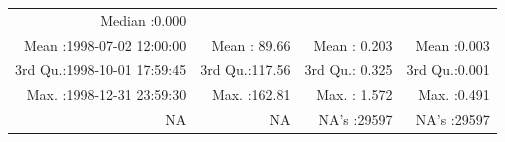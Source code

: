 \documentclass[
  10pt,
  a4paper,oneside]{article}
\begin{document}
\begin{longtable}[]{@{}rrrr@{}}
\begin{minipage}[t]{0.19\columnwidth}
Median :0.000\strut
\end{minipage}\tabularnewline
\begin{minipage}[t]{0.33\columnwidth}\raggedleft
Mean :1998-07-02 12:00:00\strut
\end{minipage} & \begin{minipage}[t]{0.19\columnwidth}\raggedleft
Mean : 89.66\strut
\end{minipage} & \begin{minipage}[t]{0.19\columnwidth}\raggedleft
Mean : 0.203\strut
\end{minipage} & \begin{minipage}[t]{0.19\columnwidth}\raggedleft
Mean :0.003\strut
\end{minipage}\tabularnewline
\begin{minipage}[t]{0.33\columnwidth}\raggedleft
3rd Qu.:1998-10-01 17:59:45\strut
\end{minipage} & \begin{minipage}[t]{0.19\columnwidth}\raggedleft
3rd Qu.:117.56\strut
\end{minipage} & \begin{minipage}[t]{0.19\columnwidth}\raggedleft
3rd Qu.: 0.325\strut
\end{minipage} & \begin{minipage}[t]{0.19\columnwidth}\raggedleft
3rd Qu.:0.001\strut
\end{minipage}\tabularnewline
\begin{minipage}[t]{0.33\columnwidth}\raggedleft
Max. :1998-12-31 23:59:30\strut
\end{minipage} & \begin{minipage}[t]{0.19\columnwidth}\raggedleft
Max. :162.81\strut
\end{minipage} & \begin{minipage}[t]{0.19\columnwidth}\raggedleft
Max. : 1.572\strut
\end{minipage} & \begin{minipage}[t]{0.19\columnwidth}\raggedleft
Max. :0.491\strut
\end{minipage}\tabularnewline
\begin{minipage}[t]{0.33\columnwidth}\raggedleft
NA\strut
\end{minipage} & \begin{minipage}[t]{0.19\columnwidth}\raggedleft
NA\strut
\end{minipage} & \begin{minipage}[t]{0.19\columnwidth}\raggedleft
NA's :29597\strut
\end{minipage} & \begin{minipage}[t]{0.19\columnwidth}\raggedleft
NA's :29597\strut
\end{minipage}\tabularnewline
\bottomrule
\end{longtable}
\end{document}
